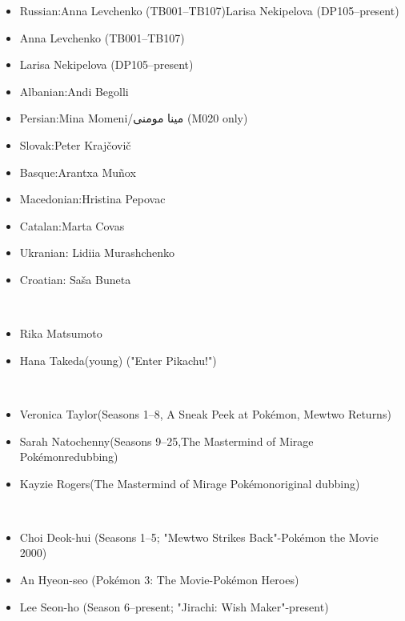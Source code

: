 \documentclass[a4paper,12pt]{article}
\begin{document}
\begin{itemize}
\item Russian:Anna Levchenko (TB001–TB107)Larisa Nekipelova (DP105–present)
\item Anna Levchenko (TB001–TB107)
\item Larisa Nekipelova (DP105–present)
\item Albanian:Andi Begolli
\item Persian:Mina Momeni/مینا مومنی (M020 only)
\item Slovak:Peter Krajčovič
\item Basque:Arantxa Muñox
\item Macedonian:Hristina Pepovac
\item Catalan:Marta Covas
\item Ukranian: Lidiia Murashchenko
\item Croatian: Saša Buneta
\end{itemize}\\ \par \vspace{0.5cm}

\begin{itemize}
\item Rika Matsumoto
\item Hana Takeda(young) ("Enter Pikachu!")
\end{itemize}\\ \par \vspace{0.5cm}

\begin{itemize}
\item Veronica Taylor(Seasons 1–8, A Sneak Peek at Pokémon, Mewtwo Returns)
\item Sarah Natochenny(Seasons 9–25,The Mastermind of Mirage Pokémonredubbing)
\item Kayzie Rogers(The Mastermind of Mirage Pokémonoriginal dubbing)
\end{itemize}\\ \par \vspace{0.5cm}

\begin{itemize}
\item Choi Deok-hui (Seasons 1–5; "Mewtwo Strikes Back"-Pokémon the Movie 2000)
\item An Hyeon-seo (Pokémon 3: The Movie-Pokémon Heroes)
\item Lee Seon-ho (Season 6–present; "Jirachi: Wish Maker"-present)
\end{itemize}\\ \par \vspace{0.5cm}
\end{document}
